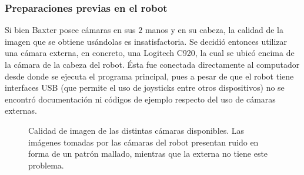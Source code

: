 \subsubsection{Preparaciones previas en el robot}
Si bien Baxter posee cámaras en sus $2$ manos y en su cabeza, la calidad de la imagen que se obtiene usándolas es insatisfactoria. Se decidió entonces utilizar una cámara externa, en concreto, una Logitech C920\cite{logitech}, la cual se ubicó encima de la cámara de la cabeza del robot. Ésta fue conectada directamente al computador desde donde se ejecuta el programa principal, pues a pesar de que el robot tiene interfaces USB (que permite el uso de joysticks entre otros dispositivos) no se encontró documentación ni códigos de ejemplo respecto del uso de cámaras externas.
\begin{figure}[h!]
	\centering
	\hfill
	\hfill
	\hfill
	\caption[Calidad de imagen de las distintas cámaras disponibles.]{Calidad de imagen de las distintas cámaras disponibles. Las imágenes tomadas por las cámaras del robot presentan ruido en forma de un patrón mallado, mientras que la externa no tiene este problema.}
	\label{camaras}
\end{figure}

